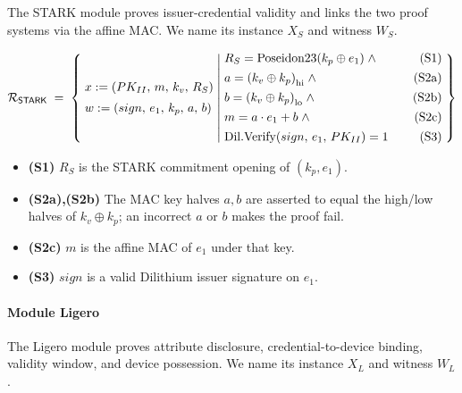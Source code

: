 \documentclass{article}
\newcommand{\hipart}[1]{{#1}_{\mathrm{hi}}}
\newcommand{\lopart}[1]{{#1}_{\mathrm{lo}}}
\newcommand{\Poseidon}{\mathrm{Poseidon23}}
\newcommand{\DilVerify}{\mathrm{Dil.Verify}}
\newcommand{\Rel}[1]{\mathcal{R}_{#1}}
\newcommand{\RelSTARK}{\Rel{\mathsf{STARK}}}
\begin{document}
The STARK module proves issuer-credential validity and links the two proof
systems via the affine MAC. We name its instance $X_S$ and witness $W_S$.

\begin{mdframed}[style=relationbox]
\[
\RelSTARK \;=\; \left\{\;
\begin{array}{@{}l@{}}
x := (PK_{II},\, m,\, k_v,\, R_S) \\[5pt]
w := (sign,\, e_1,\, k_p,\, a,\, b)
\end{array}
\;\middle|\;
\begin{array}{@{}l@{\qquad}r@{}}
R_S = \Poseidon(k_p \oplus e_1) \;\wedge & \text{(S1)} \\[4pt]
a = \hipart{(k_v \oplus k_p)} \;\wedge & \text{(S2a)} \\[4pt]
b = \lopart{(k_v \oplus k_p)} \;\wedge & \text{(S2b)} \\[4pt]
m = a \cdot e_1 + b \;\wedge & \text{(S2c)} \\[4pt]
\DilVerify(sign,\, e_1,\, PK_{II}) = 1 & \text{(S3)}
\end{array}
\;\right\}
\]
\end{mdframed}

\begin{itemize}[leftmargin=2em, itemsep=2pt]
  \item \textbf{(S1)} $R_S$ is the STARK commitment opening of $(k_p, e_1)$.
  \item \textbf{(S2a),(S2b)} The MAC key halves $a,b$ are asserted to equal
        the high/low halves of $k_v \oplus k_p$; an incorrect $a$ or $b$
        makes the proof fail.
  \item \textbf{(S2c)} $m$ is the affine MAC of $e_1$ under that key.
  \item \textbf{(S3)} $sign$ is a valid Dilithium issuer signature on $e_1$.
\end{itemize}

\paragraph{Module \textsf{Ligero}}
\label{sec:ligero}

The Ligero module proves attribute disclosure, credential-to-device binding,
validity window, and device possession. We name its instance $X_L$ and
witness $W_L$.
\end{document}
